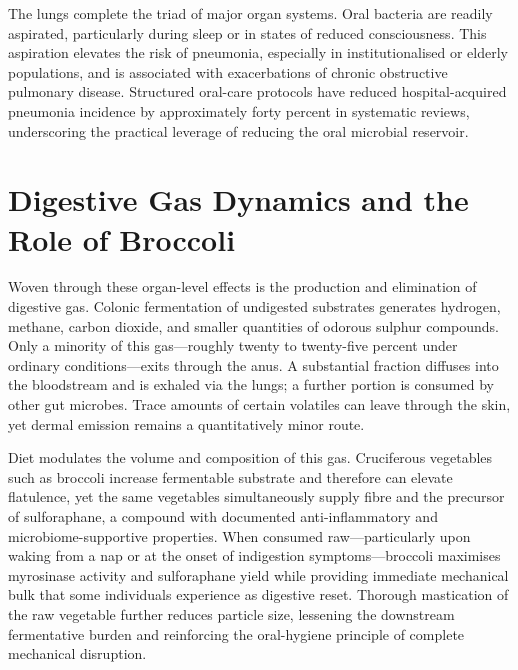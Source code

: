 \documentclass[11pt,a4paper]{article}
\begin{document}
The lungs complete the triad of major organ systems. Oral bacteria are readily aspirated, particularly during sleep or in states of reduced consciousness. This aspiration elevates the risk of pneumonia, especially in institutionalised or elderly populations, and is associated with exacerbations of chronic obstructive pulmonary disease. Structured oral-care protocols have reduced hospital-acquired pneumonia incidence by approximately forty percent in systematic reviews, underscoring the practical leverage of reducing the oral microbial reservoir.

\section{Digestive Gas Dynamics and the Role of Broccoli}
Woven through these organ-level effects is the production and elimination of digestive gas. Colonic fermentation of undigested substrates generates hydrogen, methane, carbon dioxide, and smaller quantities of odorous sulphur compounds. Only a minority of this gas---roughly twenty to twenty-five percent under ordinary conditions---exits through the anus. A substantial fraction diffuses into the bloodstream and is exhaled via the lungs; a further portion is consumed by other gut microbes. Trace amounts of certain volatiles can leave through the skin, yet dermal emission remains a quantitatively minor route.

Diet modulates the volume and composition of this gas. Cruciferous vegetables such as broccoli increase fermentable substrate and therefore can elevate flatulence, yet the same vegetables simultaneously supply fibre and the precursor of sulforaphane, a compound with documented anti-inflammatory and microbiome-supportive properties. When consumed raw---particularly upon waking from a nap or at the onset of indigestion symptoms---broccoli maximises myrosinase activity and sulforaphane yield while providing immediate mechanical bulk that some individuals experience as digestive reset. Thorough mastication of the raw vegetable further reduces particle size, lessening the downstream fermentative burden and reinforcing the oral-hygiene principle of complete mechanical disruption.
\end{document}
